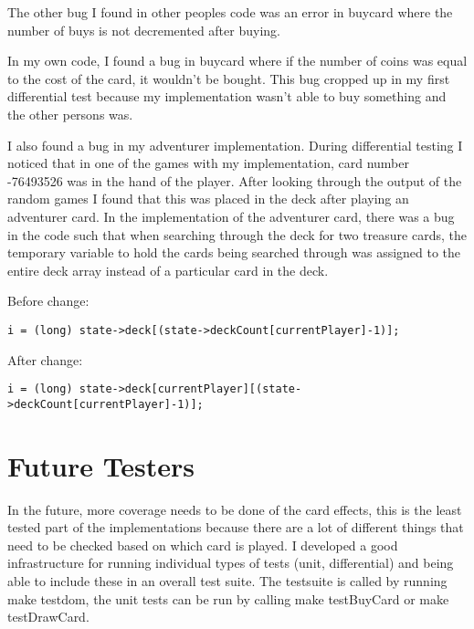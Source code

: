 \documentclass[letterpaper,12pt]{article}
\begin{document}
The other bug I found in other peoples code was an error in buycard where the number of buys is not decremented 
after buying. 

In my own code, I found a bug in buycard where if the number of coins was equal to the cost of the
card, it wouldn't be bought. This bug cropped up in my first differential test because my implementation wasn't
able to buy something and the other persons was.

I also found a bug in my adventurer implementation. During differential testing I noticed that in one of the games
with my implementation, card number -76493526 was in the hand of the player. After looking through the output of
the random games I found that this was placed in the deck after playing an adventurer card. In the implementation of
the adventurer card, there was a bug in the code such that when searching through the deck for two treasure cards,
the temporary variable to hold the cards being searched through was assigned to the entire deck array instead of a particular
card in the deck.

Before change:
\begin{verbatim}
i = (long) state->deck[(state->deckCount[currentPlayer]-1)];
\end{verbatim}

After change:
\begin{verbatim}
i = (long) state->deck[currentPlayer][(state->deckCount[currentPlayer]-1)];
\end{verbatim}

\section{Future Testers}
In the future, more coverage needs to be done of the card effects, this is the least tested part of the implementations because
there are a lot of different things that need to be checked based on which card is played. I developed a good infrastructure
for running individual types of tests (unit, differential) and being able to include these in an overall test suite. The testsuite 
is called by running make testdom, the unit tests can be run by calling make testBuyCard or make testDrawCard. 
\end{document}

